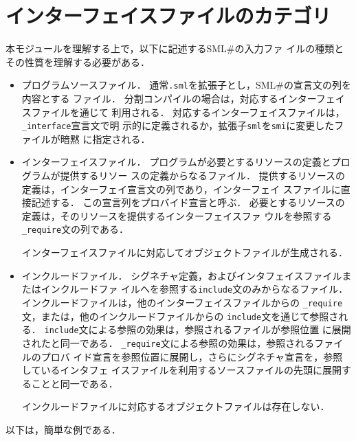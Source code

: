 \documentclass{jbook}
\newcommand{\txt}[2]{#1}
\newcommand{\smlsharp}{SML\#}
\newcommand{\code}[1]{\mbox{\large\tt #1}}
\begin{document}
\section{\txt{インターフェイスファイルのカテゴリ}{Interface file categories}}
	本モジュールを理解する上で，以下に記述する\smlsharp{}の入力ファ
イルの種類とその性質を理解する必要がある．
\begin{itemize}
\item プログラムソースファイル．
	通常\code{.sml}を拡張子とし，\smlsharp{}の宣言文の列を内容とする
ファイル．
	分割コンパイルの場合は，対応するインターフェイスファイルを通じて
利用される．
	対応するインターフェイスファイルは，\code{\_interface}宣言文で明
示的に定義されるか，拡張子\code{sml}を\code{smi}に変更したファイルが暗黙
に指定される．

\item インターフェイスファイル．
	プログラムが必要とするリソースの定義とプログラムが提供するリソー
スの定義からなるファイル．
	提供するリソースの定義は，インターフェイ宣言文の列であり，インターフェイ
スファイルに直接記述する．
	この宣言列をプロバイド宣言と呼ぶ．
	必要とするリソースの定義は，そのリソースを提供するインターフェイスファ
ウルを参照する\code{\_require}文の列である．

	インターフェイスファイルに対応してオブジェクトファイルが生成される．
	
\item インクルードファイル．
	シグネチャ定義，およびインタフェイスファイルまたはインクルードファ
イルへを参照する\code{include}文のみからなるファイル．
	インクルードファイルは，他のインターフェイスファイルからの
\code{\_require}文，または，他のインクルードファイルからの
\code{include}文を通じて参照される．
	\code{include}文による参照の効果は，参照されるファイルが参照位置
に展開されたと同一である．
	\code{\_require}文による参照の効果は，参照されるファイルのプロバ
イド宣言を参照位置に展開し，さらにシグネチャ宣言を，参照しているインタフェ
イスファイルを利用するソースファイルの先頭に展開することと同一である．

	インクルードファイルに対応するオブジェクトファイルは存在しない．
\end{itemize}
	以下は，簡単な例である．
\end{document}
